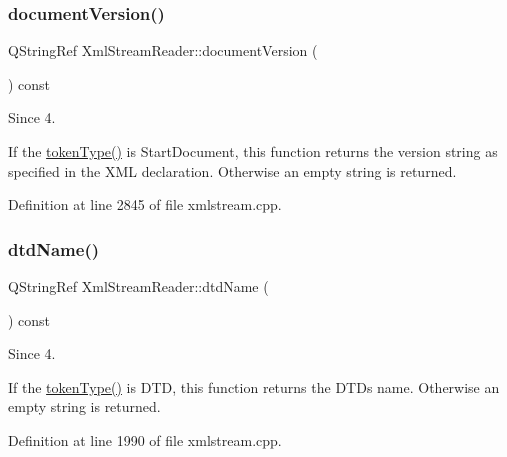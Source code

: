 \mbox{\label{class_xml_stream_reader_a6667b8f4c648c8f192802c8091f617fb}} 
\subsubsection{\texorpdfstring{document\+Version()}{documentVersion()}}
{\footnotesize\ttfamily Q\+String\+Ref Xml\+Stream\+Reader\+::document\+Version (\begin{DoxyParamCaption}{ }\end{DoxyParamCaption}) const}

\begin{DoxySince}{Since}
4.
\end{DoxySince}
If the \hyperlink{class_xml_stream_reader_a2c26bfb63c27f2992e24f038d65c8c0a}{token\+Type()} is  Start\+Document, this function returns the version string as specified in the X\+ML declaration. Otherwise an empty string is returned. 

Definition at line 2845 of file xmlstream.\+cpp.

\mbox{\label{class_xml_stream_reader_a17977920c069d3e4a71182aa07cb4eaa}} 
\subsubsection{\texorpdfstring{dtd\+Name()}{dtdName()}}
{\footnotesize\ttfamily Q\+String\+Ref Xml\+Stream\+Reader\+::dtd\+Name (\begin{DoxyParamCaption}{ }\end{DoxyParamCaption}) const}

\begin{DoxySince}{Since}
4.
\end{DoxySince}
If the \hyperlink{class_xml_stream_reader_a2c26bfb63c27f2992e24f038d65c8c0a}{token\+Type()} is  D\+TD, this function returns the D\+TD\textquotesingle{}s name. Otherwise an empty string is returned. 

Definition at line 1990 of file xmlstream.\+cpp.

\mbox{\label{class_xml_stream_reader_a5b8d61714dde7a6f75aa16555b85db18}} 
